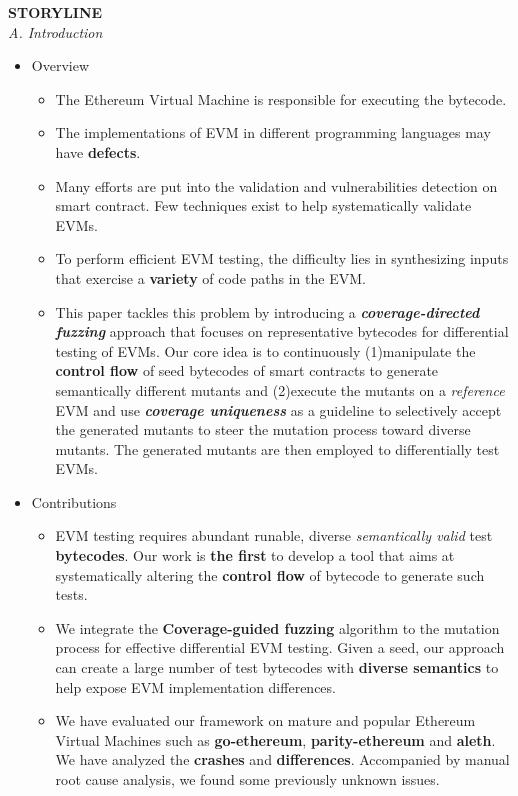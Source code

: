 \documentclass[a4paper]{article}
\begin{document}
		\textbf{STORYLINE}\\
	\textit{A. Introduction}
	\begin{itemize}
		\item Overview
		\begin{itemize}
			\item The Ethereum Virtual Machine is responsible for executing the bytecode.
			\item The implementations of EVM in different programming languages may have \textbf{defects}.
			\item Many efforts are put into the validation and vulnerabilities detection on smart contract. Few techniques exist to help systematically validate EVMs.
			\item To perform
			efficient EVM testing, the difficulty lies in synthesizing inputs that exercise a \textbf{variety} of code paths in the EVM.
			\item This paper tackles this problem by introducing a \textit{\textbf{coverage-directed fuzzing}} approach that focuses on representative bytecodes for differential testing of EVMs. Our core idea is to continuously (1)manipulate the \textbf{control flow} of seed bytecodes of smart contracts to generate semantically different mutants and (2)execute the mutants on a \textit{reference} EVM and use \textit{\textbf{coverage uniqueness}} as a guideline to selectively accept the generated mutants to steer the mutation process toward diverse mutants. The generated mutants are then employed to differentially test EVMs.
		\end{itemize}
		\item Contributions
		\begin{itemize}
			\item EVM testing requires abundant runable, diverse \textit{semantically valid} test \textbf{bytecodes}. Our work is \textbf{the first} to develop a tool that aims at systematically altering the \textbf{control flow} of bytecode to generate such tests.
			\item We integrate the \textbf{Coverage-guided fuzzing} algorithm to the mutation process for effective differential EVM testing. Given a seed, our approach can create a large number of test bytecodes with \textbf{diverse semantics} to help expose EVM implementation differences.
			\item We have evaluated our framework on mature and popular Ethereum Virtual Machines such as \textbf{go-ethereum}, \textbf{parity-ethereum} and \textbf{aleth}. We have analyzed the \textbf{crashes} and \textbf{differences}. Accompanied by manual root cause analysis, we found some previously unknown issues.

\end{itemize}
\end{itemize}
\end{document}
